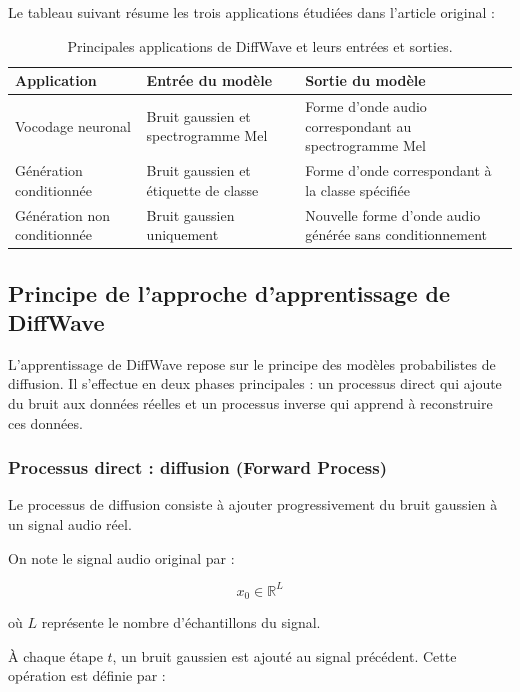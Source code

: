 Le tableau suivant résume les trois applications étudiées
dans l'article original :

\begin{table}[H]
\centering
\renewcommand{\arraystretch}{1.5}
\begin{tabular}{|p{3.2cm}|p{5cm}|p{5cm}|}
\hline
\textbf{Application} &
\textbf{Entrée du modèle} &
\textbf{Sortie du modèle} \\
\hline

Vocodage neuronal &
Bruit gaussien et spectrogramme Mel &
Forme d'onde audio correspondant au spectrogramme Mel \\
\hline

Génération conditionnée &
Bruit gaussien et étiquette de classe &
Forme d'onde correspondant à la classe spécifiée \\
\hline

Génération non conditionnée &
Bruit gaussien uniquement &
Nouvelle forme d'onde audio générée sans conditionnement \\
\hline
\end{tabular}
\caption{Principales applications de DiffWave et leurs
entrées et sorties.}
\label{tab:diffwave_applications}
\end{table}

\subsection{Principe de l'approche d'apprentissage de DiffWave}

L'apprentissage de DiffWave repose sur le principe des
modèles probabilistes de diffusion. Il s'effectue en deux
phases principales : un processus direct qui ajoute du bruit
aux données réelles et un processus inverse qui apprend
à reconstruire ces données.

\subsubsection{Processus direct : diffusion (Forward Process)}

Le processus de diffusion consiste à ajouter progressivement
du bruit gaussien à un signal audio réel.

On note le signal audio original par :

\[
x_0 \in \mathbb{R}^{L}
\]

où $L$ représente le nombre d'échantillons du signal.

À chaque étape $t$, un bruit gaussien est ajouté au signal
précédent. Cette opération est définie par :

